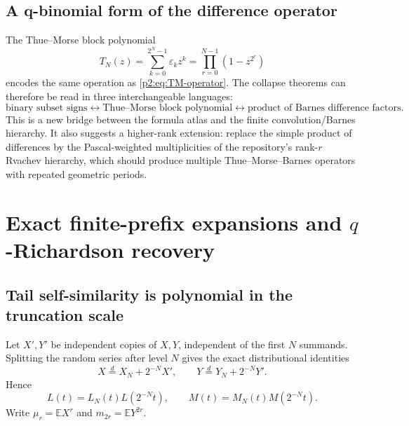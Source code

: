 \documentclass[11pt,oneside]{article}
\numberwithin{equation}{section}
\theoremstyle{definition}
\theoremstyle{remark}
\newcommand{\eps}{\varepsilon}
\begin{document}
\subsection{A q-binomial form of the difference operator}

The Thue--Morse block polynomial
\begin{equation}
 T_N(z)=\sum_{k=0}^{2^N-1}\eps_kz^k
 =\prod_{r=0}^{N-1}(1-z^{2^r})
 \label{p2:eq:TN}
\end{equation}
encodes the same operation as \eqref{p2:eq:TM-operator}.  The collapse theorems can therefore be read
in three interchangeable languages:
\begin{equation}
 \text{binary subset signs}
 \longleftrightarrow
 \text{Thue--Morse block polynomial}
 \longleftrightarrow
 \text{product of Barnes difference factors}.
 \label{p2:eq:three-languages}
\end{equation}
This is a new bridge between the formula atlas and the finite convolution/Barnes hierarchy.  It also
suggests a higher-rank extension: replace the simple product of differences by the Pascal-weighted
multiplicities of the repository's rank-$r$ Rvachev hierarchy, which should produce multiple
Thue--Morse--Barnes operators with repeated geometric periods.

\section{Exact finite-prefix expansions and \texorpdfstring{$q$}{q}-Richardson recovery}
\label{p2:sec:richardson}

\subsection{Tail self-similarity is polynomial in the truncation scale}

Let $X',Y'$ be independent copies of $X,Y$, independent of the first $N$ summands.  Splitting the
random series after level $N$ gives the exact distributional identities
\begin{equation}
 X\overset{d}=X_N+2^{-N}X',
 \qquad
 Y\overset{d}=Y_N+2^{-N}Y'.
 \label{p2:eq:tail-self-similarity}
\end{equation}
Hence
\begin{equation}
 L(t)=L_N(t)L(2^{-N}t),
 \qquad
 M(t)=M_N(t)M(2^{-N}t).
 \label{p2:eq:finite-infinite-mgf}
\end{equation}
Write $\mu_r=\mathbb EX^r$ and $m_{2r}=\mathbb EY^{2r}$.
\end{document}
